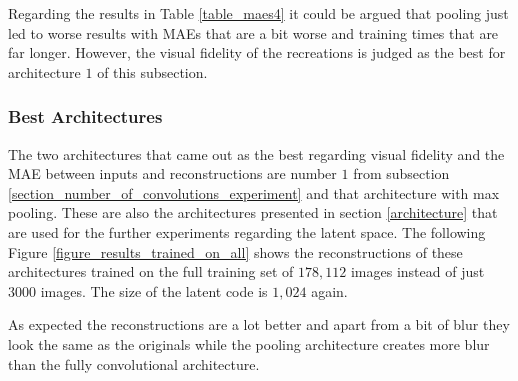 Regarding the results in Table \ref{table_maes4} it could be argued that pooling just led to worse results with
MAEs that are a bit worse and training times that are far longer. However, the visual fidelity of the recreations
is judged as the best for architecture $1$ of this subsection.


\subsubsection{Best Architectures}

The two architectures that came out as the best regarding visual fidelity and the MAE between inputs and 
reconstructions are number $1$ from subsection \ref{section_number_of_convolutions_experiment} and that architecture
with max pooling. These are also the architectures presented in section \ref{architecture} that are used
for the further experiments regarding the latent space. The following Figure \ref{figure_results_trained_on_all}
shows the reconstructions of these architectures trained on the full training set of $178,112$ images instead
of just $3000$ images. The size of the latent code is $1,024$ again.

As expected the reconstructions are a lot better and apart from a bit of blur they look the same as the originals
while the pooling architecture creates more blur than the fully convolutional architecture.

